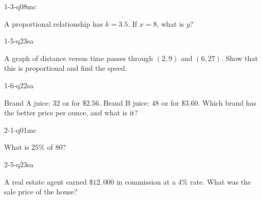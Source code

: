 
\begin{practiceQuestion}{1-3-q08}{mc}
\begin{questionText}
A proportional relationship has $k = 3.5$. If $x = 8$, what is $y$?
\end{questionText}
\end{practiceQuestion}

\begin{practiceQuestion}{1-5-q23}{sa}
\begin{questionText}
A graph of distance versus time passes through $(2, 9)$ and $(6, 27)$. Show that this is proportional and find the speed.
\end{questionText}
\end{practiceQuestion}

\begin{practiceQuestion}{1-6-q22}{sa}
\begin{questionText}
Brand A juice: $32$ oz for $\$2.56$. Brand B juice: $48$ oz for $\$3.60$. Which brand has the better price per ounce, and what is it?
\end{questionText}
\end{practiceQuestion}

\begin{practiceQuestion}{2-1-q01}{mc}
\begin{questionText}
What is $25\%$ of $80$?
\end{questionText}
\end{practiceQuestion}

\begin{practiceQuestion}{2-5-q23}{sa}
\begin{questionText}
A real estate agent earned $\$12{,}000$ in commission at a $4\%$ rate. What was the sale price of the house?
\end{questionText}
\end{practiceQuestion}

